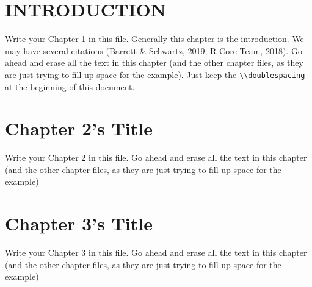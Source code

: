 \documentclass{DissertateUSU}
\begin{document}
\fancyhead[R]{\thepage} \fancyfoot[C]{} \listoftables

\newpage

\fancyhead[R]{\thepage} \fancyfoot[C]{} \listoffigures

\newpage


\newpage

\fancyhead[R]{\thepage} \fancyfoot[C]{}

\chapter{INTRODUCTION}

\doublespacing

Write your Chapter 1 in this file. Generally this chapter is the
introduction. We may have several citations (Barrett \& Schwartz, 2019;
R Core Team, 2018). Go ahead and erase all the text in this chapter (and
the other chapter files, as they are just trying to fill up space for
the example). Just keep the
\texttt{\textbackslash{}\textbackslash{}doublespacing} at the beginning
of this document.

\lipsum

\FloatBarrier
\newpage
\fancyhead[R]{\thepage} \fancyfoot[C]{}

\chapter{Chapter 2's Title}

\doublespacing

Write your Chapter 2 in this file. Go ahead and erase all the text in
this chapter (and the other chapter files, as they are just trying to
fill up space for the example)

\lipsum

\FloatBarrier
\newpage
\fancyhead[R]{\thepage} \fancyfoot[C]{}

\chapter{Chapter 3's Title}

\doublespacing

Write your Chapter 3 in this file. Go ahead and erase all the text in
this chapter (and the other chapter files, as they are just trying to
fill up space for the example)

\lipsum

\FloatBarrier
\newpage
\fancyhead[R]{\thepage} \fancyfoot[C]{}
\end{document}
